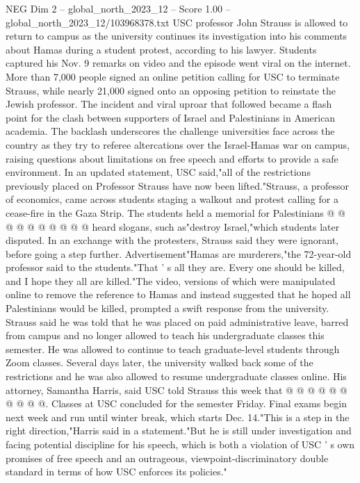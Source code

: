 \begin{textsample}{NEG Dim 2 – global\_north\_2023\_12 – Score 1.00 – global\_north\_2023\_12/103968378.txt}  \label{ex:f2_neg_333}
USC professor John Strauss is allowed to return to campus as the university continues its investigation into his comments about Hamas during a student protest, according to his lawyer.
Students captured his Nov. 9 remarks on video and the episode went viral on the internet.
More than 7,000 people signed an online petition calling for USC to terminate Strauss, while nearly 21,000 signed onto an opposing petition to reinstate the Jewish professor.
The incident and viral uproar that followed became a flash point for the clash between supporters of Israel and Palestinians in American academia.
The backlash underscores the challenge universities face across the country as they try to referee altercations over the Israel-Hamas war on campus, raising questions about limitations on free speech and efforts to provide a safe environment.
In an updated statement, USC said,"all of the restrictions previously placed on Professor Strauss have now been lifted."Strauss, a professor of economics, came across students staging a walkout and protest calling for a cease-fire in the Gaza Strip.
The students held a memorial for Palestinians @ @ @ @ @ @ @ @ @ @ heard slogans, such as"destroy Israel,"which students later disputed.
In an exchange with the protesters, Strauss said they were ignorant, before going a step further.
Advertisement"Hamas are murderers,"the 72-year-old professor said to the students."That ' s all they are.
Every one should be killed, and I hope they all are killed."The video, versions of which were manipulated online to remove the reference to Hamas and instead suggested that he hoped all Palestinians would be killed, prompted a swift response from the university.
Strauss said he was told that he was placed on paid administrative leave, barred from campus and no longer allowed to teach his undergraduate classes this semester.
He was allowed to continue to teach graduate-level students through Zoom classes.
Several days later, the university walked back some of the restrictions and he was also allowed to resume undergraduate classes online.
His attorney, Samantha Harris, said USC told Strauss this week that @ @ @ @ @ @ @ @ @ @.
Classes at USC concluded for the semester Friday.
Final exams begin next week and run until winter break, which starts Dec. 14."This is a step in the right direction,"Harris said in a statement."But he is still under investigation and facing potential discipline for his speech, which is both a violation of USC ' s own promises of free speech and an outrageous, viewpoint-discriminatory double standard in terms of how USC enforces its policies."

\end{textsample}
